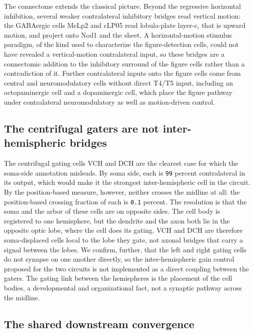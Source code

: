 \documentclass[11pt]{article}
\newcommand{\rid}[1]{\texttt{\small #1}}
\begin{document}
The connectome extends the classical picture. Beyond the regressive horizontal inhibition,
several weaker contralateral inhibitory bridges read vertical motion: the GABAergic cells MeLp2
and cLP05 read lobula-plate layer-c, that is upward motion, and project onto Nod1 and the sheet. A
horizontal-motion stimulus paradigm, of the kind used to characterize the figure-detection cells,
could not have revealed a vertical-motion contralateral input, so these bridges are a connectomic
addition to the inhibitory surround of the figure cells rather than a contradiction of it.
Further contralateral inputs onto the figure cells come from central and neuromodulatory cells
without direct T4/T5 input, including an octopaminergic cell and a dopaminergic cell, which place
the figure pathway under contralateral neuromodulatory as well as motion-driven control.

\subsection{The centrifugal gaters are not inter-hemispheric bridges}

The centrifugal gating cells VCH and DCH are the clearest case for which the soma-side annotation
misleads. By soma side, each is \rid{99} percent contralateral in its output, which would make it
the strongest inter-hemispheric cell in the circuit. By the position-based measure, however,
neither crosses the midline at all: the position-based crossing fraction of each is \rid{0.1}
percent. The resolution is that the soma and the arbor of these cells are on opposite sides. The
cell body is registered to one hemisphere, but the dendrite and the axon both lie in the opposite
optic lobe, where the cell does its gating. VCH and DCH are therefore soma-displaced cells local
to the lobe they gate, not axonal bridges that carry a signal between the lobes. We confirm,
further, that the left and right gating cells do not synapse on one another directly, so the
inter-hemispheric gain control proposed for the two circuits is not implemented as a direct
coupling between the gaters. The gating link between the hemispheres is the placement of the cell
bodies, a developmental and organizational fact, not a synaptic pathway across the midline.

\subsection{The shared downstream convergence}
\end{document}
